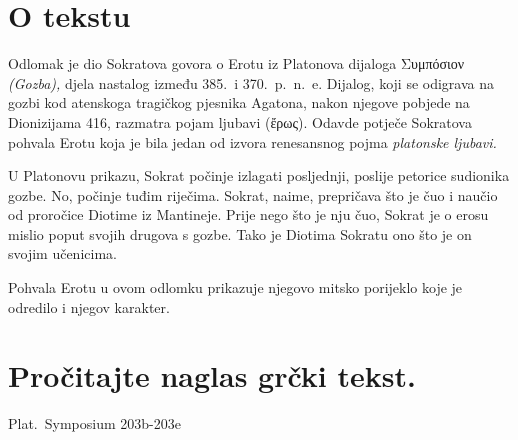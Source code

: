


\section*{O tekstu}

Odlomak je dio Sokratova govora o Erotu iz Platonova dijaloga \textgreek[variant=ancient]{Συμπόσιον} \textit{(Gozba),} djela nastalog između 385.\ i 370.\ p.~n.~e. Dijalog, koji se odigrava na gozbi kod atenskoga tragičkog pjesnika Agatona, nakon njegove pobjede na Dionizijama 416, razmatra pojam ljubavi \textgreek[variant=ancient]{(ἔρως).} Odavde potječe Sokratova pohvala Erotu koja je bila jedan od izvora renesansnog pojma \textit{platonske ljubavi.}

U Platonovu prikazu, Sokrat počinje izlagati posljednji, poslije petorice sudionika gozbe. No, počinje tuđim riječima. Sokrat, naime, prepričava što je čuo i naučio od proročice Diotime iz Mantineje. Prije nego što je nju čuo, Sokrat je o erosu mislio poput svojih drugova s gozbe. Tako je Diotima Sokratu ono što je on svojim učenicima.

Pohvala Erotu u ovom odlomku prikazuje njegovo mitsko porijeklo koje je odredilo i njegov karakter.



\section*{Pročitajte naglas grčki tekst.}

Plat.\ Symposium 203b-203e


\medskip


